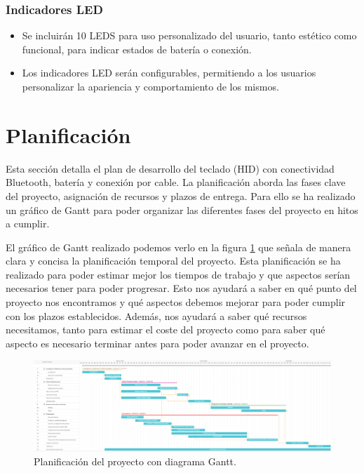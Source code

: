\subsubsection{Indicadores \gls{LED}}
\begin{itemize}
\item Se incluirán 10 \gls{LED}S para uso personalizado del usuario, tanto estético como funcional, para indicar estados de batería o conexión.
\item Los indicadores \gls{LED} serán configurables, permitiendo a los usuarios personalizar la apariencia y comportamiento de los mismos.
\end{itemize}

\section{Planificación}

Esta sección detalla el plan de desarrollo del teclado (\gls{HID}) con conectividad \gls{Bluetooth}, batería y conexión por cable. La planificación aborda las fases clave del proyecto, asignación de recursos y plazos de entrega. Para ello se ha realizado un gráfico de Gantt para poder organizar las diferentes fases del proyecto en hitos a cumplir.

El gráfico de Gantt realizado podemos verlo en la figura \ref{fig:DiagramaGantt} que señala de manera clara y concisa la planificación temporal del proyecto. Esta planificación se ha realizado para poder estimar mejor los tiempos de trabajo y que aspectos serían necesarios tener para poder progresar. Esto nos ayudará a saber en qué punto del proyecto nos encontramos y qué aspectos debemos mejorar para poder cumplir con los plazos establecidos. Además, nos ayudará a saber qué recursos necesitamos, tanto para estimar el coste del proyecto como para saber qué aspecto es necesario terminar antes para poder avanzar en el proyecto.

\begin{figure}
\centering
\includegraphics[width=\textheight]{imagenes/Capitulos/Cap02/DiagramaGantt.png}
\caption{Planificación del proyecto con diagrama Gantt.}
\label{fig:DiagramaGantt}
\end{figure}
